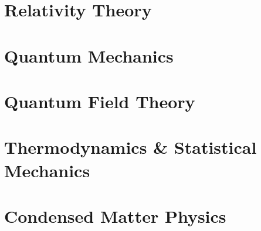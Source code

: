 \documentclass[11pt, a4paper]{report}
\begin{document}
\part{Relativity Theory}


\part{Quantum Mechanics}








\part{Quantum Field Theory}



%



\part{Thermodynamics \& Statistical Mechanics}



\part{Condensed Matter Physics}


\end{document}
